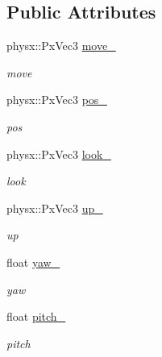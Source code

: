 \subsection*{Public Attributes}
\begin{DoxyCompactItemize}
\item 
physx::PxVec3 \hyperlink{classnebula_1_1content_1_1actor_1_1admin_1_1controller_aa2e924d116a8af2af378cd37816eb899}{move\_\-}
\begin{DoxyCompactList}\small\item\em move \item\end{DoxyCompactList}\item 
physx::PxVec3 \hyperlink{classnebula_1_1content_1_1actor_1_1admin_1_1controller_a6024418e033d20bbb4ce9912e01a59da}{pos\_\-}
\begin{DoxyCompactList}\small\item\em pos \item\end{DoxyCompactList}\item 
physx::PxVec3 \hyperlink{classnebula_1_1content_1_1actor_1_1admin_1_1controller_a2759f6005029cb9b0480f0b3d9b4d2f8}{look\_\-}
\begin{DoxyCompactList}\small\item\em look \item\end{DoxyCompactList}\item 
physx::PxVec3 \hyperlink{classnebula_1_1content_1_1actor_1_1admin_1_1controller_a5e09f81eb05ce73277241d0e1ebdab02}{up\_\-}
\begin{DoxyCompactList}\small\item\em up \item\end{DoxyCompactList}\item 
float \hyperlink{classnebula_1_1content_1_1actor_1_1admin_1_1controller_ac38bfc8b00f66b3849706bb1ef21db44}{yaw\_\-}
\begin{DoxyCompactList}\small\item\em yaw \item\end{DoxyCompactList}\item 
float \hyperlink{classnebula_1_1content_1_1actor_1_1admin_1_1controller_a42a295e189c869f3edf4a6131adbc700}{pitch\_\-}
\begin{DoxyCompactList}\small\item\em pitch \item\end{DoxyCompactList}\item 

\end{DoxyCompactItemize}

